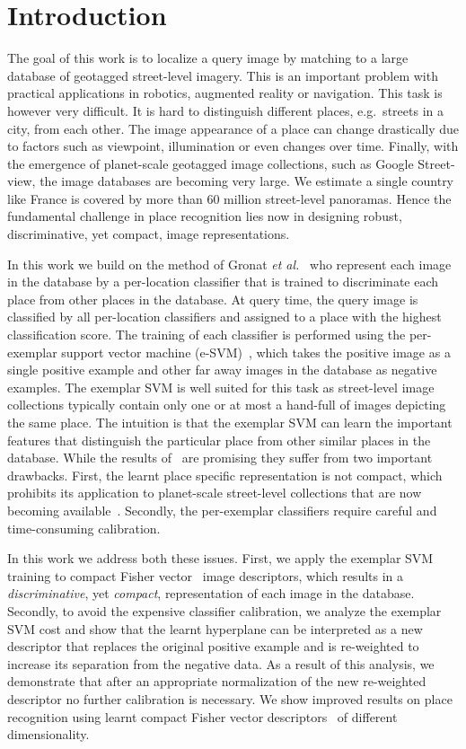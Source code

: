 \documentclass[10pt,twocolumn,letterpaper]{article}
\begin{document}
\section{Introduction}
   \noindent
   The goal of this work is to localize a query image by matching to a large database of geotagged street-level imagery.
   This is an important problem with practical applications in robotics, augmented reality or navigation. This task is however very difficult. It is hard to distinguish different places, e.g.\ streets in a city, from each other. The image appearance of a place can change drastically due to factors such as  viewpoint, illumination or even changes over time.
   Finally, with the emergence of planet-scale geotagged image collections, such as Google Street-view, the image databases are becoming very large. We estimate a single country like France is covered by more than 60 million street-level panoramas. Hence the fundamental challenge in place recognition lies now in designing robust, discriminative, yet compact, image representations.

   In this work we build on the method of Gronat {\it et al.}~\cite{Gronat13} who represent each image in the database by a per-location classifier that is trained to discriminate each place from other places in the database. At query time, the query image is classified by all per-location classifiers and assigned to a place with the highest classification score. The training of each classifier is performed using the per-exemplar support vector machine (e-SVM)~\cite{Malisiewicz11}, which takes the positive image as a single positive example and other far away images in the database as negative examples. 
   The exemplar SVM is well suited for this task as street-level image collections typically contain only one or at most a hand-full of images depicting the same place. The intuition is that the exemplar SVM can learn the important features that distinguish the particular place from other similar places  in the database.  While the results of~\cite{Gronat13} are promising they suffer from two important drawbacks. First, the learnt place specific representation is not compact, which prohibits its application to planet-scale street-level collections that are now becoming available~\cite{Klinger13}. Secondly, the per-exemplar classifiers require careful and time-consuming calibration.


   In this work we address both these issues. 
   First, we apply the exemplar SVM training to compact Fisher vector~\cite{Jegou2011,Perronnin2010} image descriptors, which results in a {\em discriminative}, yet {\em compact}, representation of each image in the database. Secondly, to avoid the expensive classifier calibration, we analyze the exemplar SVM cost and show that the learnt hyperplane can be interpreted as a new descriptor that replaces the original positive example and is re-weighted to increase its separation from the negative data. As a result of this analysis, we demonstrate that after an appropriate normalization of the new re-weighted descriptor no further calibration is necessary. We show improved results on place recognition using learnt compact Fisher vector descriptors~\cite{Jegou2011} of different dimensionality.
\end{document}
